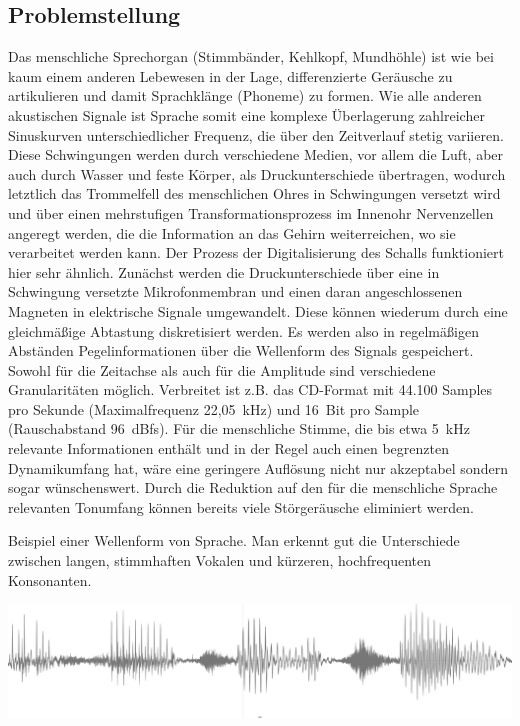 \subsection{Problemstellung}
Das menschliche Sprechorgan (Stimmbänder, Kehlkopf, Mundhöhle) ist wie bei kaum einem anderen Lebewesen in der Lage, differenzierte Geräusche zu artikulieren und damit Sprachklänge (Phoneme) zu formen.
Wie alle anderen akustischen Signale ist Sprache somit eine komplexe Überlagerung zahlreicher Sinuskurven unterschiedlicher Frequenz, die über den Zeitverlauf stetig variieren.
Diese Schwingungen werden durch verschiedene Medien, vor allem die Luft, aber auch durch Wasser und feste Körper, als Druckunterschiede übertragen, wodurch letztlich das Trommelfell des menschlichen Ohres in Schwingungen versetzt wird und über einen mehrstufigen Transformationsprozess im Innenohr Nervenzellen angeregt werden, die die Information an das Gehirn weiterreichen, wo sie verarbeitet werden kann.
Der Prozess der Digitalisierung des Schalls funktioniert hier sehr ähnlich.
Zunächst werden die Druckunterschiede über eine in Schwingung versetzte Mikrofonmembran und einen daran angeschlossenen Magneten in elektrische Signale umgewandelt.
Diese können wiederum durch eine gleichmäßige Abtastung diskretisiert werden.
Es werden also in regelmäßigen Abständen Pegelinformationen über die Wellenform des Signals gespeichert.
Sowohl für die Zeitachse als auch für die Amplitude sind verschiedene Granularitäten möglich.
Verbreitet ist z.B.
das CD-Format mit 44.100 Samples pro Sekunde (Maximalfrequenz 22,05~kHz) und 16~Bit pro Sample (Rauschabstand 96~dBfs).
Für die menschliche Stimme, die bis etwa 5~kHz relevante Informationen enthält und in der Regel auch einen begrenzten Dynamikumfang hat, wäre eine geringere Auflösung nicht nur akzeptabel sondern sogar wünschenswert.
Durch die Reduktion auf den für die menschliche Sprache relevanten Tonumfang können bereits viele Störgeräusche eliminiert werden.

Beispiel einer Wellenform von Sprache.
Man erkennt gut die Unterschiede zwischen langen, stimmhaften Vokalen und kürzeren, hochfrequenten Konsonanten.

\includegraphics{chapters/sprachverarbeitung/01.png}

